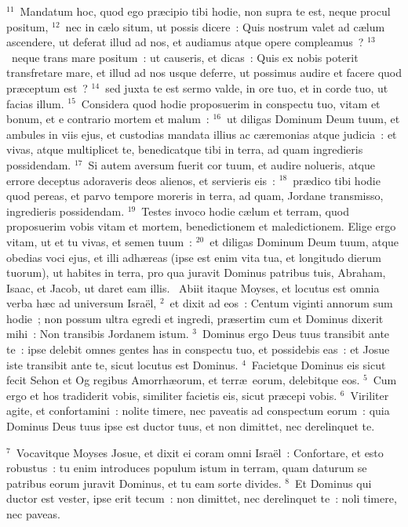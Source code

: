 ${}^{11}$~Mandatum hoc, quod ego pr\ae cipio tibi hodie, non supra te est, neque procul positum,
${}^{12}$~nec in c\ae lo situm, ut possis dicere~: Quis nostrum valet ad c\ae lum ascendere, ut deferat illud ad nos, et audiamus atque opere compleamus~?
${}^{13}$~neque trans mare positum~: ut causeris, et dicas~: Quis ex nobis poterit transfretare mare, et illud ad nos usque deferre, ut possimus audire et facere quod pr\ae ceptum est~?
${}^{14}$~sed juxta te est sermo valde, in ore tuo, et in corde tuo, ut facias illum.
${}^{15}$~Considera quod hodie proposuerim in conspectu tuo, vitam et bonum, et e contrario mortem et malum~:
${}^{16}$~ut diligas Dominum Deum tuum, et ambules in viis ejus, et custodias mandata illius ac c\ae remonias atque judicia~: et vivas, atque multiplicet te, benedicatque tibi in terra, ad quam ingredieris possidendam.
${}^{17}$~Si autem aversum fuerit cor tuum, et audire nolueris, atque errore deceptus adoraveris deos alienos, et servieris eis~:
${}^{18}$~pr\ae dico tibi hodie quod pereas, et parvo tempore moreris in terra, ad quam, Jordane transmisso, ingredieris possidendam.
${}^{19}$~Testes invoco hodie c\ae lum et terram, quod proposuerim vobis vitam et mortem, benedictionem et maledictionem. Elige ergo vitam, ut et tu vivas, et semen tuum~:
${}^{20}$~et diligas Dominum Deum tuum, atque obedias voci ejus, et illi adh\ae reas (ipse est enim vita tua, et longitudo dierum tuorum), ut habites in terra, pro qua juravit Dominus patribus tuis, Abraham, Isaac, et Jacob, ut daret eam illis.
~\lettrine[lines=10,image=true,loversize=0.05,lraise=-0.03]{A}{}biit itaque Moyses, et locutus est omnia verba h\ae c ad universum Isra\"el,
${}^{2}$~et dixit ad eos~: Centum viginti annorum sum hodie~; non possum ultra egredi et ingredi, pr\ae sertim cum et Dominus dixerit mihi~: Non transibis Jordanem istum.
${}^{3}$~Dominus ergo Deus tuus transibit ante te~: ipse delebit omnes gentes has in conspectu tuo, et possidebis eas~: et Josue iste transibit ante te, sicut locutus est Dominus.
${}^{4}$~Facietque Dominus eis sicut fecit Sehon et Og regibus Amorrh\ae orum, et terr\ae\ eorum, delebitque eos.
${}^{5}$~Cum ergo et hos tradiderit vobis, similiter facietis eis, sicut pr\ae cepi vobis.
${}^{6}$~Viriliter agite, et confortamini~: nolite timere, nec paveatis ad conspectum eorum~: quia Dominus Deus tuus ipse est ductor tuus, et non dimittet, nec derelinquet te.


${}^{7}$~Vocavitque Moyses Josue, et dixit ei coram omni Isra\"el~: Confortare, et esto robustus~: tu enim introduces populum istum in terram, quam daturum se patribus eorum juravit Dominus, et tu eam sorte divides.
${}^{8}$~Et Dominus qui ductor est vester, ipse erit tecum~: non dimittet, nec derelinquet te~: noli timere, nec paveas.


